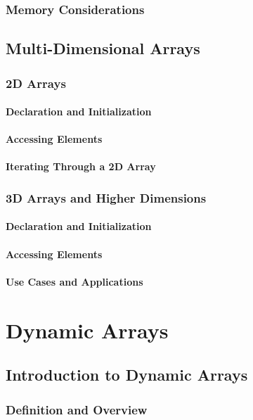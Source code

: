\documentclass{book}
\begin{document}
	\subsection{Memory Considerations}
	
	\section{Multi-Dimensional Arrays}
	\subsection{2D Arrays}
	\subsubsection{Declaration and Initialization}
	\subsubsection{Accessing Elements}
	\subsubsection{Iterating Through a 2D Array}
	\subsection{3D Arrays and Higher Dimensions}
	\subsubsection{Declaration and Initialization}
	\subsubsection{Accessing Elements}
	\subsubsection{Use Cases and Applications}
	
	\chapter{Dynamic Arrays}
	\section{Introduction to Dynamic Arrays}
	\subsection{Definition and Overview}
\end{document}
